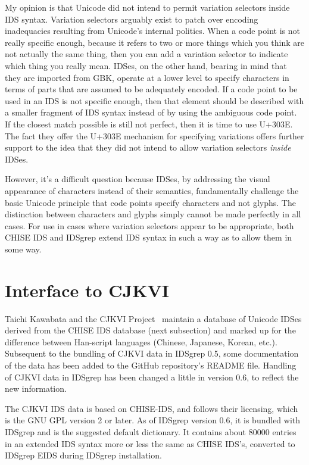 \documentclass[twocolumn]{report}
\begin{document}
My opinion is that Unicode did not intend to permit variation selectors
inside IDS syntax.  Variation selectors arguably exist to patch over
encoding inadequacies resulting from Unicode's internal politics.  When a
code point is not really specific enough, because it refers to two or more
things which you think are not actually the same thing, then you can add a
variation selector to indicate which thing you really mean.  IDSes, on the
other hand, bearing in mind that they are imported from GBK, operate at a
lower level to specify characters in terms of parts that are assumed to be
adequately encoded.  If a code point to be used in an IDS is not specific
enough, then that element should be described with a smaller fragment of IDS
syntax instead of by using the ambiguous code point.  If the closest match
possible is still not perfect, then it is time to use U+303E.  The fact they
offer the U+303E mechanism for specifying variations offers further support
to the idea that they did not intend to allow variation selectors
\emph{inside} IDSes.

However, it's a difficult question because IDSes, by addressing the visual
appearance of characters instead of their semantics, fundamentally challenge
the basic Unicode principle that code points specify characters and not
glyphs.  The distinction between characters and glyphs simply cannot be made
perfectly in all cases.  For use in cases where variation selectors appear
to be appropriate, both CHISE IDS and IDSgrep extend IDS syntax in
such a way as to allow them in some way.


\section{Interface to CJKVI}

Taichi Kawabata and the CJKVI Project~\cite{CJKVI} maintain a database of
Unicode IDSes derived from the CHISE IDS database (next subsection) and
marked up for the difference between Han-script languages (Chinese, Japanese,
Korean, etc.).  Subsequent to the bundling of CJKVI data in IDSgrep 0.5, some
documentation of the data has been added to the GitHub repository's README
file.  Handling of CJKVI data in IDSgrep has been changed a little in
version 0.6, to reflect the new information.

The CJKVI IDS data is based on CHISE-IDS, and follows their licensing, which
is the GNU GPL version 2 or later.  As of IDSgrep version 0.6, it is bundled
with IDSgrep and is the suggested default dictionary.  It contains about
80000 entries in an extended IDS syntax more or less the same as CHISE
IDS's, converted to IDSgrep EIDS during IDSgrep installation.
\end{document}
